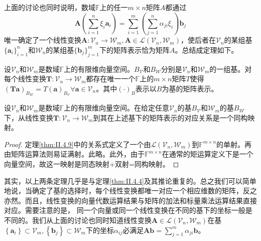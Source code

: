 \documentclass[main.tex]{subfiles}
\begin{document}
上面的讨论也同时说明，数域$\mathbb{F}$上的任一$m\times n$矩阵$A$都通过
\[
\mathbf{A}\left(\sum_{i=1}^n\xi_i\mathbf{a}_i\right)=\sum_{i=1}^m\left(\sum_{j=1}^n\alpha_{ji}\xi_i\right)\mathbf{b}_j
\]
唯一确定了一个线性变换$\mathbf{A}:\mathcal{V}_n\rightarrow\mathcal{W}_m,\mathbf{A}\in\mathcal{L}\left(\mathcal{V}_n,\mathcal{W}_m\right)$，使后者在$\mathcal{V}_n$的某组基$\{\mathbf{a}_i\}_{i=1}^n$和$\mathcal{W}_n$的某组基$\{\mathbf{b}_j\}_{j=1}^m$下的矩阵表示恰为矩阵$A$。总结成定理如下。

\begin{theorem}\label{thm:II.4.9}
设$\mathcal{V}_n$和$\mathcal{W}_m$是数域$\mathbb{F}$上的有限维向量空间。$B_\mathcal{V}$和$B_\mathcal{W}$分别是$\mathcal{V}_n$和$\mathcal{W}_m$的一组基。对每个线性变换$\mathbf{T}:\mathcal{V}_n\rightarrow\mathcal{W}_m$都存在唯一一个$\mathbb{F}$上的$m\times n$矩阵$T$使得$\left(\mathbf{Ta}\right)_{B_\mathcal{W}}=T\left(\mathbf{a}\right)_{B_\mathcal{V}}\forall\mathbf{a}\in\mathcal{V}_n$。其中$\left(\cdot\right)_B$表示以$B$为基的矩阵表示。
\end{theorem}

\begin{theorem}\label{thm:II.4.10}
设$\mathcal{V}_n$和$\mathcal{W}_m$是数域$\mathbb{F}$上的有限维向量空间。在给定任意$\mathcal{V}_n$的基$B_\mathcal{V}$和$\mathcal{W}_m$的基$B_\mathcal{W}$下，从线性变换$\mathbf{T}:\mathcal{V}_n\rightarrow\mathcal{W}_m$到其在上述基下的矩阵表示的对应关系是一个同构映射。
\end{theorem}
\begin{proof}
定理\ref{thm:II.4.9}中的关系式定义了一个由$\mathcal{L}\left(\mathcal{V}_n,\mathcal{W}_m\right)$到$\mathbb{F}^{m\times n}$的单射。再由矩阵运算法则易证满射。此略。此外，由于$\mathbb{F}^{m\times n}$在通常的矩运算定义下是一个向量空间，故这一映射是同态映射+双射=同构映射。
\end{proof}

其实，以上两条定理几乎是与定理\ref{thm:II.4.4}及其推论重复的。总之我们可以简单地说，当确定了基的选择时，每个线性变换都唯一对应一个相应维数的矩阵，反之亦然。而且，线性变换的向量代数运算结果与矩阵的加法和标量乘法运算结果直接对应。需要注意的是， 同一个向量或同一个线性变换在不同的基下的坐标一般是不同的。我们从上面的讨论也同时知道线性变换$\mathbf{A}\in\mathcal{L}\left(\mathcal{V}_n,\mathcal{W}_m\right)$在基$\left\{\mathbf{a}_i\right\}\subset\mathcal{V}_m,\left\{\mathbf{b}_j\right\}\subset\mathcal{W}_m$下的坐标$\alpha_{ij}$必满足$\mathbf{Ab}=\sum_{j=1}^m\alpha_{ji}\mathbf{b}$。
\end{document}
